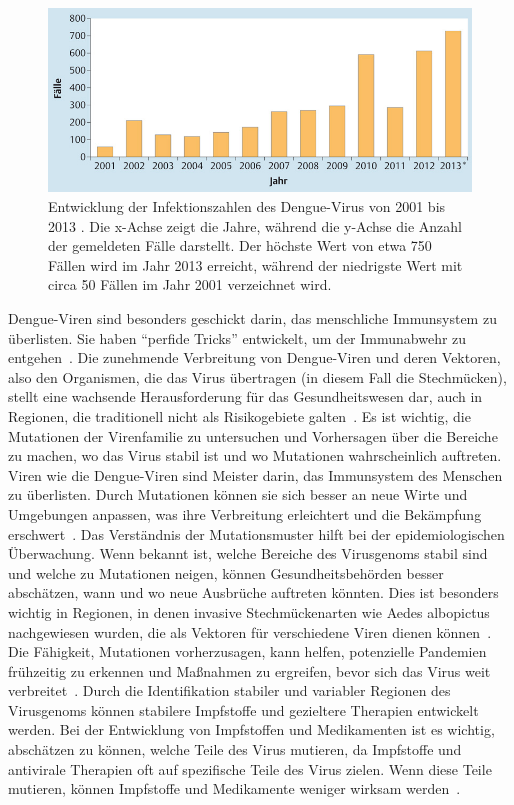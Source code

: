 \documentclass[german,version-2022-01]{uzl-thesis}
\begin{document}
\begin{figure}[tbp]
  \centering
  \includegraphics[scale=0.5]{Images/infektionszahlen_dengue_virus_deutschland.jpeg}
  \caption{Entwicklung der Infektionszahlen des Dengue-Virus von 2001 bis 2013 \cite{cramer_dengue-virus_2014}. Die x-Achse zeigt die Jahre, w\"ahrend die y-Achse die Anzahl der gemeldeten F\"alle darstellt. Der h\"ochste Wert von etwa 750 F\"allen wird im Jahr 2013 erreicht, w\"ahrend der niedrigste Wert mit circa 50 F\"allen im Jahr 2001 verzeichnet wird.}
  \label{fig:Dengue_virus_infektionszahlen_deutschland}
\end{figure} Dengue-Viren sind besonders geschickt darin, das menschliche Immunsystem zu \"uberlisten. Sie haben "`perfide Tricks"' entwickelt, um der Immunabwehr zu entgehen~\cite{janisch_klein_2017}. Die zunehmende Verbreitung von Dengue-Viren und deren Vektoren, also den Organismen, die das Virus \"ubertragen (in diesem Fall die Stechm\"ucken), stellt eine wachsende Herausforderung f\"ur das Gesundheitswesen dar, auch in Regionen, die traditionell nicht als Risikogebiete galten~\cite{cramer_dengue-virus_2014}. Es ist wichtig, die Mutationen der Virenfamilie zu untersuchen und Vorhersagen \"uber die Bereiche zu machen, wo das Virus stabil ist und wo Mutationen wahrscheinlich auftreten. Viren wie die Dengue-Viren sind Meister darin, das Immunsystem des Menschen zu \"uberlisten. Durch Mutationen k\"onnen sie sich besser an neue Wirte und Umgebungen anpassen, was ihre Verbreitung erleichtert und die Bek\"ampfung erschwert~\cite{cramer_dengue-virus_2014, janisch_klein_2017}. Das Verst\"andnis der Mutationsmuster hilft bei der epidemiologischen \"Uberwachung. Wenn bekannt ist, welche Bereiche des Virusgenoms stabil sind und welche zu Mutationen neigen, k\"onnen Gesundheitsbeh\"orden besser absch\"atzen, wann und wo neue Ausbr\"uche auftreten k\"onnten. Dies ist besonders wichtig in Regionen, in denen invasive Stechm\"uckenarten wie Aedes albopictus nachgewiesen wurden, die als Vektoren f\"ur verschiedene Viren dienen k\"onnen~\cite{cramer_dengue-virus_2014}. Die F\"ahigkeit, Mutationen vorherzusagen, kann helfen, potenzielle Pandemien fr\"uhzeitig zu erkennen und Ma\ss{}nahmen zu ergreifen, bevor sich das Virus weit verbreitet~\cite{janisch_klein_2017}. Durch die Identifikation stabiler und variabler Regionen des Virusgenoms k\"onnen stabilere Impfstoffe und gezieltere Therapien entwickelt werden. Bei der Entwicklung von Impfstoffen und Medikamenten ist es wichtig, absch\"atzen zu k\"onnen, welche Teile des Virus mutieren, da Impfstoffe und antivirale Therapien oft auf spezifische Teile des Virus zielen. Wenn diese Teile mutieren, k\"onnen Impfstoffe und Medikamente weniger wirksam werden~\cite{janisch_klein_2017}. 
\end{document}
